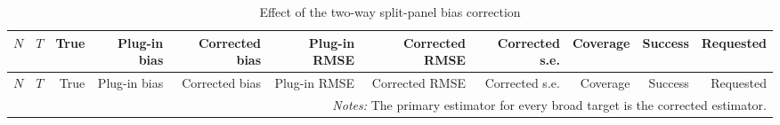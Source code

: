 \begingroup
\small
\begin{longtable}{rrrrrrrrrrr}
\caption{Effect of the two-way split-panel bias correction}\label{tab:mc-bias-correction}\\
\toprule
$N$ & $T$ & True & Plug-in bias & Corrected bias & Plug-in RMSE & Corrected RMSE & Corrected s.e. & Coverage & Success & Requested \\
\midrule
\endfirsthead
\toprule
$N$ & $T$ & True & Plug-in bias & Corrected bias & Plug-in RMSE & Corrected RMSE & Corrected s.e. & Coverage & Success & Requested \\
\midrule
\endhead
\bottomrule
\multicolumn{11}{p{0.96\linewidth}}{\footnotesize \textit{Notes:} The primary estimator for every broad target is the corrected estimator.} \\
\end{longtable}
\endgroup
